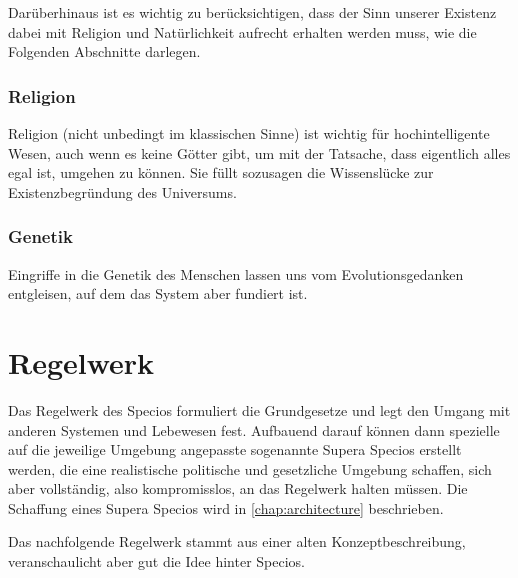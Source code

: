 Darüberhinaus ist es wichtig zu berücksichtigen, dass der Sinn unserer Existenz dabei mit Religion und Natürlichkeit aufrecht erhalten werden muss, wie die Folgenden Abschnitte darlegen.

\subsubsection{Religion}

Religion (nicht unbedingt im klassischen Sinne) ist wichtig für hochintelligente Wesen, auch wenn es keine Götter gibt, um mit der Tatsache, dass eigentlich alles egal ist, umgehen zu können. Sie füllt sozusagen die Wissenslücke zur Existenzbegründung des Universums.

\subsubsection{Genetik}

Eingriffe in die Genetik des Menschen lassen uns vom Evolutionsgedanken entgleisen, auf dem das System aber fundiert ist.

\section{Regelwerk}\label{sec:rulebook}

Das Regelwerk des Specios formuliert die Grundgesetze und legt den Umgang mit anderen Systemen und Lebewesen fest. Aufbauend darauf können dann spezielle auf die jeweilige Umgebung angepasste sogenannte Supera Specios erstellt werden, die eine realistische politische und gesetzliche Umgebung schaffen, sich aber vollständig, also kompromisslos, an das Regelwerk halten müssen. Die Schaffung eines Supera Specios wird in \vref{chap:architecture} beschrieben.

Das nachfolgende Regelwerk stammt aus einer alten Konzeptbeschreibung, veranschaulicht aber gut die Idee hinter Specios.

